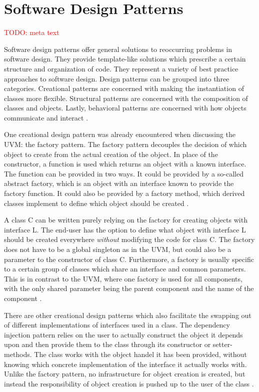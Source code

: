 \documentclass[11pt,a4paper]{report}
\newcommand{\todo}[1]{\textcolor{red}{TODO: #1}}
\begin{document}
\section{Software Design Patterns} %

\todo{meta text}

Software design patterns offer general solutions to reoccurring problems in software design. They provide
template-like solutions which prescribe a certain structure and organization of code. They represent a variety of
best practice approaches to software design. Design patterns can be grouped into three categories. Creational
patterns are concerned with making the instantiation of classes more flexible. Structural patterns are concerned with
the composition of classes and objects. Lastly, behavioral patterns are concerned with how objects communicate and
interact \cite[Ch. 1]{design_patterns}.

One creational design pattern was already encountered when discussing the UVM: the factory pattern. The factory
pattern decouples the decision of which object to create from the actual creation of the object. In place of the
constructor, a function is used which returns an object with a known interface. The function can be provided in two
ways. It could be provided by a so-called abstract factory, which is an object with an interface known to provide the
factory function. It could also be provided by a factory method, which derived classes implement to define which
object should be created \cite[Ch. 3]{design_patterns}.

A class C can be written purely relying on the factory for creating objects with interface L. The end-user has the
option to define what object with interface L should be created everywhere \textit{without} modifying the code for
class C. The factory does not have to be a global singleton as in the UVM, but could also be a parameter to the
constructor of class C. Furthermore, a factory is usually specific to a certain group of classes which share an
interface and common parameters. This is in contrast to the UVM, where one factory is used for all components, with
the only shared parameter being the parent component and the name of the component \cite[Ch. 3]{design_patterns}.

There are other creational design patterns which also facilitate the swapping out of different implementations of
interfaces used in a class. The dependency injection pattern relies on the user to actually construct the object it
depends upon and then provide them to the class through its constructor or setter-methods. The class works with the
object handel it has been provided, without knowing which concrete implementation of the interface it actually works
with. Unlike the factory pattern, no infrastructure for object creation is created, but instead the responsibility of
object creation is pushed up to the user of the class \cite{ioc_di}.
\end{document}
